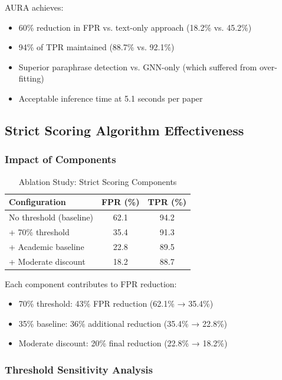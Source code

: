 \documentclass[conference]{IEEEtran}
\begin{document}
AURA achieves:
\begin{itemize}
    \item 60\% reduction in FPR vs. text-only approach (18.2\% vs. 45.2\%)
    \item 94\% of TPR maintained (88.7\% vs. 92.1\%)
    \item Superior paraphrase detection vs. GNN-only (which suffered from over-fitting)
    \item Acceptable inference time at 5.1 seconds per paper
\end{itemize}

\subsection{Strict Scoring Algorithm Effectiveness}

\subsubsection{Impact of Components}

\begin{table}[htbp]
\caption{Ablation Study: Strict Scoring Components}
\begin{center}
\begin{tabular}{|l|c|c|}
\hline
\textbf{Configuration} & \textbf{FPR (\%)} & \textbf{TPR (\%)} \\
\hline
No threshold (baseline) & 62.1 & 94.2 \\
+ 70\% threshold & 35.4 & 91.3 \\
+ Academic baseline & 22.8 & 89.5 \\
+ Moderate discount & 18.2 & 88.7 \\
\hline
\end{tabular}
\label{tab:ablation}
\end{center}
\end{table}

Each component contributes to FPR reduction:
\begin{itemize}
    \item 70\% threshold: 43\% FPR reduction (62.1\% → 35.4\%)
    \item 35\% baseline: 36\% additional reduction (35.4\% → 22.8\%)
    \item Moderate discount: 20\% final reduction (22.8\% → 18.2\%)
\end{itemize}

\subsubsection{Threshold Sensitivity Analysis}
\end{document}

